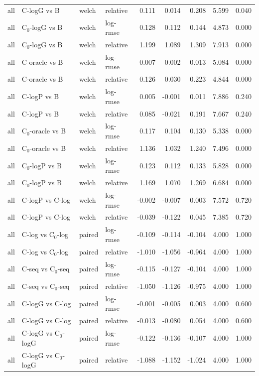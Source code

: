 \begin{longtable}{llllrrrrr}
all & C-logG vs B & welch & relative & 0.111 & 0.014 & 0.208 & 5.599 & 0.040 \\
all & C$_0$-logG vs B & welch & log-rmse & 0.128 & 0.112 & 0.144 & 4.873 & 0.000 \\
all & C$_0$-logG vs B & welch & relative & 1.199 & 1.089 & 1.309 & 7.913 & 0.000 \\
all & C-oracle vs B & welch & log-rmse & 0.007 & 0.002 & 0.013 & 5.084 & 0.000 \\
all & C-oracle vs B & welch & relative & 0.126 & 0.030 & 0.223 & 4.844 & 0.000 \\
all & C-logP vs B & welch & log-rmse & 0.005 & -0.001 & 0.011 & 7.886 & 0.240 \\
all & C-logP vs B & welch & relative & 0.085 & -0.021 & 0.191 & 7.667 & 0.240 \\
all & C$_0$-oracle vs B & welch & log-rmse & 0.117 & 0.104 & 0.130 & 5.338 & 0.000 \\
all & C$_0$-oracle vs B & welch & relative & 1.136 & 1.032 & 1.240 & 7.496 & 0.000 \\
all & C$_0$-logP vs B & welch & log-rmse & 0.123 & 0.112 & 0.133 & 5.828 & 0.000 \\
all & C$_0$-logP vs B & welch & relative & 1.169 & 1.070 & 1.269 & 6.684 & 0.000 \\
all & C-logP vs C-log & welch & log-rmse & -0.002 & -0.007 & 0.003 & 7.572 & 0.720 \\
all & C-logP vs C-log & welch & relative & -0.039 & -0.122 & 0.045 & 7.385 & 0.720 \\
all & C-log vs C$_0$-log & paired & log-rmse & -0.109 & -0.114 & -0.104 & 4.000 & 1.000 \\
all & C-log vs C$_0$-log & paired & relative & -1.010 & -1.056 & -0.964 & 4.000 & 1.000 \\
all & C-seq vs C$_0$-seq & paired & log-rmse & -0.115 & -0.127 & -0.104 & 4.000 & 1.000 \\
all & C-seq vs C$_0$-seq & paired & relative & -1.050 & -1.126 & -0.975 & 4.000 & 1.000 \\
all & C-logG vs C-log & paired & log-rmse & -0.001 & -0.005 & 0.003 & 4.000 & 0.600 \\
all & C-logG vs C-log & paired & relative & -0.013 & -0.080 & 0.054 & 4.000 & 0.600 \\
all & C-logG vs C$_0$-logG & paired & log-rmse & -0.122 & -0.136 & -0.107 & 4.000 & 1.000 \\
all & C-logG vs C$_0$-logG & paired & relative & -1.088 & -1.152 & -1.024 & 4.000 & 1.000 \\

\end{longtable}
